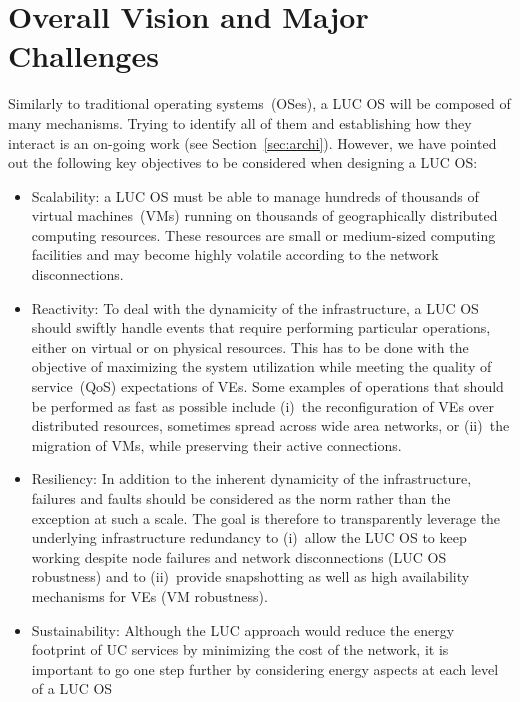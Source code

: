 \section{Overall Vision and Major Challenges\label{sec:challenges}}

Similarly to traditional operating systems~(OSes), a LUC OS will be composed of
many mechanisms. Trying to identify all of them and establishing how they
interact is an on-going work (see Section~\ref{sec:archi}). However,
we have pointed out the following
key objectives to be considered when designing a LUC OS:

\begin{itemize} 
\item Scalability: a LUC OS must be able to manage hundreds of
  thousands of virtual machines~(VMs) running on thousands of 
  geographically distributed computing resources.  These resources are small or
  medium-sized computing facilities and may become highly volatile according to the network disconnections.  
\item Reactivity: To deal with the dynamicity of the infrastructure, a LUC OS
  should swiftly handle events that require performing particular
  operations, either on virtual or on physical resources. This has to be done with the
  objective of maximizing the system utilization while meeting the quality of service~(QoS) expectations of VEs. 
  Some examples of operations that should be performed as fast as possible include (i)~the reconfiguration
  of VEs over distributed resources, sometimes spread across wide area networks, or (ii)~the migration of VMs, 
  while preserving their active connections.
\item Resiliency: In addition to the inherent dynamicity of the
  infrastructure, failures and faults should be considered as the norm rather than the
exception at such a scale. The goal is therefore to transparently leverage the
underlying infrastructure redundancy to (i)~allow the LUC OS to keep
working despite node failures and network disconnections (LUC OS robustness) and to (ii)~provide
snapshotting as well as high availability mechanisms for VEs (VM robustness).
\item Sustainability: Although the LUC approach would reduce the energy
footprint of UC services by minimizing the cost of the network, 
it is important to go one
step further by considering energy aspects at each level of a LUC OS

\end{itemize}
